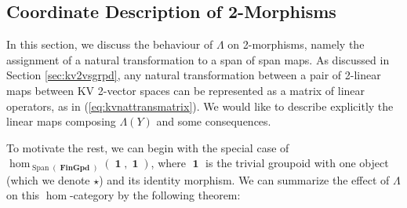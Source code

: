 \documentclass[10pt]{amsart}
\numberwithin{theorem}{subsection}
\newcommand{\opname}[1]{\operatorname{#1}}
\newcommand{\catname}[1]{\boldsymbol{\opname{{#1}}}}
\newcommand{\Span}{\opname{Span}}
\newcommand{\Gpd}{\catname{FinGpd}}
\newcommand{\FV}{\Lambda}
\begin{document}
\subsection{Coordinate Description of 2-Morphisms}\label{sec:coordY}

In this section, we discuss the behaviour of $\FV$ on 2-morphisms,
namely the assignment of a natural transformation to a span of span
maps.  As discussed in Section \ref{sec:kv2vsgrpd}, any natural
transformation between a pair of 2-linear maps between KV 2-vector
spaces can be represented as a matrix of linear operators, as in
(\ref{eq:kvnattransmatrix}).  We would like to describe explicitly the
linear maps composing $\FV(Y)$ and some consequences.

To motivate the rest, we can begin with the special case of
$\hom_{\Span(\Gpd)}(\catname{1},\catname{1})$, where $\catname{1}$ is
the trivial groupoid with one object (which we denote $\star$) and its
identity morphism.  We can summarize the effect of $\FV$ on this
$\hom$-category by the following theorem:
\end{document}
